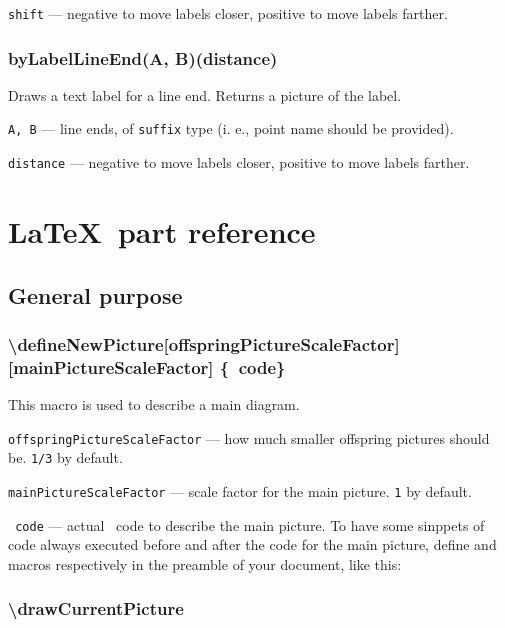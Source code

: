 \documentclass{ltxdoc}
\begin{document}
	\texttt{shift} — negative to move labels closer, positive to move labels farther.

\subsubsection{byLabelLineEnd(A, B)(distance)}\label{byLabelLineEnd}
	
	Draws a text label for a line end. Returns a picture of the label.
	
	\texttt{A, B} — line ends, of \texttt{suffix} type (i. e., point name should be provided).
	
	\texttt{distance} — negative to move labels closer, positive to move labels farther.


\section{\LaTeX\ part reference}

\subsection{General purpose}

\subsubsection{\textbackslash defineNewPicture[offspringPictureScaleFactor] [mainPictureScaleFactor] \{\METAPOST\ code\}}

	This macro is used to describe a main diagram.

	\texttt{offspringPictureScaleFactor} — how much smaller offspring pictures should be. \texttt{1/3} by default.
	
	\texttt{mainPictureScaleFactor} — scale factor for the main picture. \texttt{1} by default.
	
	\texttt{\METAPOST\ code} — actual \METAPOST\ code to describe the main picture. To have some sinppets of code always executed before and after the code for the main picture, define  and  macros respectively in the preamble of your document, like this:
	
\begin{LaTeXCode}
\def\mpPre{...some MP code...}
\def\mpPost{...some MP code...}
\end{LaTeXCode}


\subsubsection{\textbackslash drawCurrentPicture}
	
\end{document}
